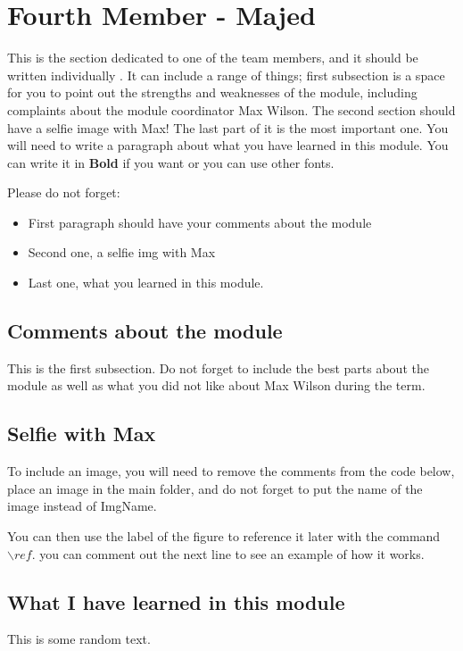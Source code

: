 \section{Fourth Member - Majed}
This is the section dedicated to one of the team members, and it should be written individually . It can include a range of things; first subsection is a space for you to point out the strengths and weaknesses of the module, including complaints about the module coordinator Max Wilson. The second section should have a selfie image with Max! The last part of it is the most important one. You will need to write a paragraph about what you have learned in this module. You can write it in \textbf{Bold} if you want or you can use other fonts. 

Please do not forget:
\begin{itemize}
	\item First paragraph should have your comments about the module
	\item Second one, a selfie img with Max
	\item Last one, what you learned in this module.
\end{itemize}

\subsection{Comments about the module}
This is the first subsection. Do not forget to include the best parts about the module as well as what you did not like about Max Wilson during the term.

\subsection{Selfie with Max}

To include an image, you will need to remove the comments from the code below, place an image in the main folder, and do not forget to put the name of the image instead of ImgName. 


You can then use the label of the figure to reference it later with the command ${\backslash}ref$. you can comment out the next line to see an example of how it works.


\subsection{What I have learned in this module}
This is some random text.

